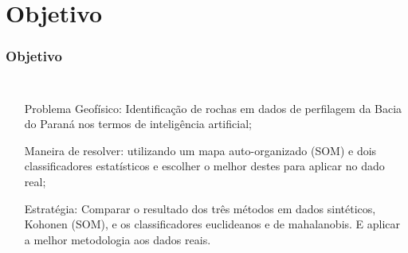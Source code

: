 \documentclass[aspectratio=10]{beamer} %
\begin{document}
\begin{frame}
\begin{figure}[H]
	\qquad
	\qquad
	\label{1BN0002SCb}
\end{figure}
\end{frame}

\section{Objetivo}

\begin{frame}
	\frametitle{Objetivo}
	\begin{columns}\footnotesize 
		\justifying
		\begin{itemize}
			\item[Problema Geofísico:] Identificação de rochas em dados de perfilagem da Bacia do Paraná nos termos de inteligência artificial;
			\pause
			\item[Maneira de resolver:] utilizando um mapa auto-organizado (SOM)  e dois classificadores estatísticos e escolher o melhor destes para aplicar no dado real;
			\pause
			\item[Estratégia:] Comparar o resultado dos três métodos em dados sintéticos, Kohonen (SOM),  e os classificadores euclideanos e de mahalanobis. E aplicar a melhor metodologia aos dados reais. 
		\end{itemize}
	\end{columns}
\end{frame}
\end{document}
